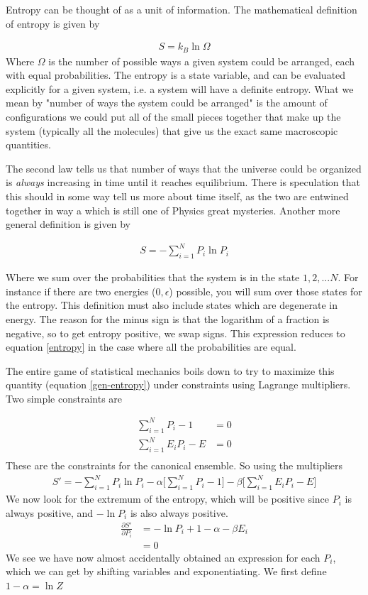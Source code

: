Entropy can be thought of as a unit of information. The mathematical definition of entropy is given by

\begin{align}\label{entropy}
S = k_B\ln\Omega
\end{align}
Where $\Omega$ is the number of possible ways a given system could be arranged, each with equal probabilities. The entropy is a state variable, and can be evaluated explicitly for a given system, i.e. a system will have a definite entropy. What we mean by "number of ways the system could be arranged" is the amount of configurations we could put all of the small pieces together that make up the system (typically all the molecules) that give us the exact same macroscopic quantities. %



 The second law tells us that number of ways that the universe could be organized is \emph{always} increasing in time until it reaches equilibrium. There is speculation that this should in some way tell us more about time itself, as the two are entwined together in way a which is still one of Physics great mysteries\cite{weinert}. Another more general definition is given by

\begin{align}\label{gen-entropy}
S = -\sum_{i=1}^N P_i\ln P_i
\end{align}

Where we sum over the probabilities that the system is in the state $1,2,... N$. For instance if there are two energies ($0,\epsilon$) possible, you will sum over those states for the entropy. This definition must also include states which are degenerate in energy. The reason for the minus sign is that the logarithm of a fraction is negative, so to get entropy positive, we swap signs. This expression reduces to equation \ref{entropy} in the case where all the probabilities are equal. 

The entire game of statistical mechanics boils down to try to maximize this quantity (equation \ref{gen-entropy}) under constraints using Lagrange multipliers. Two simple constraints are

\begin{align}\label{sumprob}
\sum_{i=1}^N P_i -1 &= 0\\ \label{sumenergy}
\sum_{i=1}^N E_iP_i - E &= 0\\
\end{align}
These are the constraints for the canonical ensemble. So using the multipliers
\begin{align}
S' = -\sum_{i=1}^N P_i\ln P_i - \alpha\Big[\sum_{i=1}^N P_i -1\Big] - \beta\Big[\sum_{i=1}^N E_iP_i - E\Big]
\end{align}
We now look for the extremum of the entropy, which will be positive since $P_i$ is always positive, and $-\ln P_i$ is also always positive. 
\begin{align}
\frac{\partial S'}{\partial P_i} &= -\ln P_i  + 1 -\alpha - \beta E_i\\
 &= 0 
\end{align}
We see we have now almost accidentally obtained an expression for each $P_i$, which we can get by shifting variables and exponentiating. We first define $1-\alpha = \ln Z$


